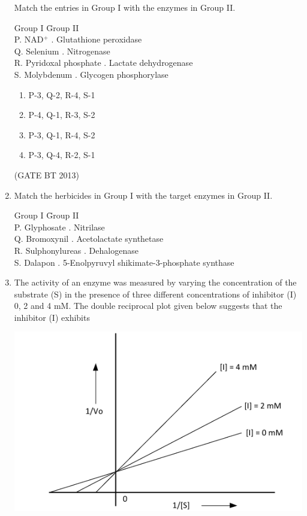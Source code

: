 \documentclass[journal,12pt,onecolumn]{IEEEtran}
\theoremstyle{remark}
\begin{document}
\begin{enumerate}
Match the entries in Group I with the enzymes in Group II.

\begin{tabbing}
Group I \hspace{3.5cm} \= Group II \\
P. NAD$^+$ . Glutathione peroxidase \\
Q. Selenium . Nitrogenase \\
R. Pyridoxal phosphate . Lactate dehydrogenase \\
S. Molybdenum . Glycogen phosphorylase \\
\end{tabbing}

\begin{enumerate}[label=(\Alph*)]
    \item P-3, Q-2, R-4, S-1
    \item P-4, Q-1, R-3, S-2
    \item P-3, Q-1, R-4, S-2
    \item P-3, Q-4, R-2, S-1
\end{enumerate} \hfill(GATE BT 2013)

\item 

Match the herbicides in Group I with the target enzymes in Group II.

\begin{tabbing}
Group I \hspace{3.5cm} \= Group II \\
P. Glyphosate . Nitrilase \\
Q. Bromoxynil . Acetolactate synthetase \\
R. Sulphonylureas . Dehalogenase \\
S. Dalapon . 5-Enolpyruvyl shikimate-3-phosphate synthase \\
\end{tabbing}


    \item The activity of an enzyme was measured by varying the concentration of the substrate (S) 
    in the presence of three different concentrations of inhibitor (I) 0, 2 and 4 mM. 
    The double reciprocal plot given below suggests that the inhibitor (I) exhibits

    \begin{center}
    \includegraphics[width=\columnwidth]{images/enzyme_plot.png}
    \end{center}


\end{enumerate}
\end{document}
